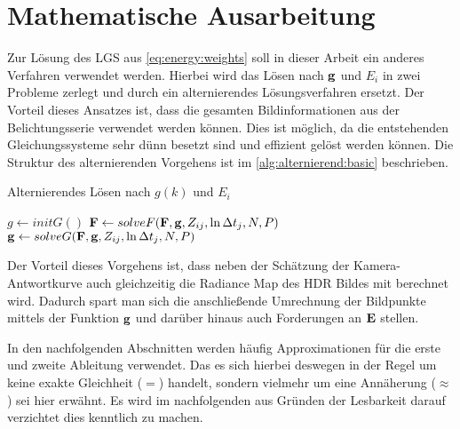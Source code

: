 \chapter{Mathematische Ausarbeitung}
\label{chap:maths}
Zur Lösung des \gls{LGS} aus \autoref{eq:energy:weights} soll in dieser Arbeit ein anderes Verfahren verwendet werden. Hierbei wird das Lösen nach $\b g$ und $E_i$ in zwei Probleme zerlegt und durch ein alternierendes Lösungsverfahren ersetzt. Der Vorteil dieses Ansatzes ist, dass die gesamten Bildinformationen aus der Belichtungsserie verwendet werden können. Dies ist möglich, da die entstehenden Gleichungssysteme sehr dünn besetzt sind und effizient gelöst werden können. Die Struktur des alternierenden Vorgehens ist im \autoref{alg:alternierend:basic} beschrieben.

\begin{Algorithmus} %
\caption{Alternierendes Lösen nach $g(k)$ und $E_i$}
\label{alg:alternierend:basic}
\begin{algorithmic}
	\State $g \gets initG()$
		\State $\mathbf F \gets solveF(\mathbf F, \mathbf g, Z_{ij}, \ln \Delta t_j, N, P)$ 
		\State $\mathbf g \gets solveG(\mathbf F, \mathbf g, Z_{ij}, \ln \Delta t_j, N, P)$
	\EndWhile
	\State \Return [$\b g$, $\b F$]
\EndFunction
\end{algorithmic}
\end{Algorithmus}

Der Vorteil dieses Vorgehens ist, dass neben der Schätzung der Kamera-Antwortkurve auch gleichzeitig die \gls{Radiance Map} des \gls{HDR} Bildes mit berechnet wird. Dadurch spart man sich die anschließende Umrechnung der Bildpunkte mittels der Funktion $\b g$ und darüber hinaus auch Forderungen an $\mathbf E$ stellen.

In den nachfolgenden Abschnitten werden häufig Approximationen für die erste und zweite Ableitung verwendet. Das es sich hierbei deswegen in der Regel um keine exakte Gleichheit ($=$) handelt, sondern vielmehr um eine Annäherung ($\approx$) sei hier erwähnt. Es wird im nachfolgenden aus Gründen der Lesbarkeit darauf verzichtet dies kenntlich zu machen.


